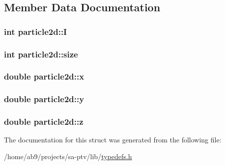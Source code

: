 \subsection{Member Data Documentation}
\hypertarget{structparticle2d_a6e0771b5312a5ef4a159637bf59d34e1}{
\subsubsection[{I}]{\setlength{\rightskip}{0pt plus 5cm}int particle2d\-::\-I}}\label{db/da4/structparticle2d_a6e0771b5312a5ef4a159637bf59d34e1}
\hypertarget{structparticle2d_abc90f84ed6bf498d7317e8e8ca83a8b8}{
\subsubsection[{size}]{\setlength{\rightskip}{0pt plus 5cm}int particle2d\-::size}}\label{db/da4/structparticle2d_abc90f84ed6bf498d7317e8e8ca83a8b8}
\hypertarget{structparticle2d_a284e37207b47400f6a47010f5e141b02}{
\subsubsection[{x}]{\setlength{\rightskip}{0pt plus 5cm}double particle2d\-::x}}\label{db/da4/structparticle2d_a284e37207b47400f6a47010f5e141b02}
\hypertarget{structparticle2d_a20ba47dec5ad0b909811d4848c9340a5}{
\subsubsection[{y}]{\setlength{\rightskip}{0pt plus 5cm}double particle2d\-::y}}\label{db/da4/structparticle2d_a20ba47dec5ad0b909811d4848c9340a5}
\hypertarget{structparticle2d_ad282947b9a81b636c508f132ea1c3ea0}{
\subsubsection[{z}]{\setlength{\rightskip}{0pt plus 5cm}double particle2d\-::z}}\label{db/da4/structparticle2d_ad282947b9a81b636c508f132ea1c3ea0}


The documentation for this struct was generated from the following file\-:\begin{DoxyCompactItemize}
\item 
/home/ab9/projects/sa-\/ptv/lib/\hyperlink{typedefs_8h}{typedefs.\-h}\end{DoxyCompactItemize}
